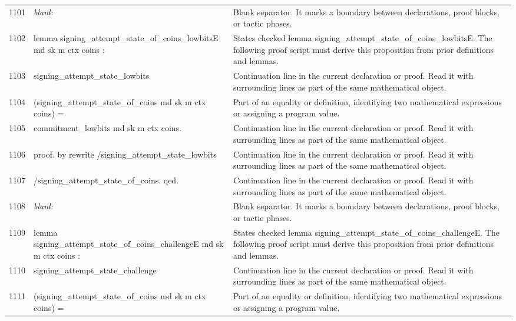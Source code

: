 \documentclass[10pt]{article}
\begin{document}
\begin{longtable}{r L{0.53\textwidth} L{0.37\textwidth}}
1101 & {\ttfamily\scriptsize \emph{blank}} & Blank separator.  It marks a boundary between declarations, proof blocks, or tactic phases. \\
1102 & {\ttfamily\scriptsize lemma signing\_attempt\_state\_of\_coins\_lowbitsE md sk m ctx coins :} & States checked lemma signing\_attempt\_state\_of\_coins\_lowbitsE.  The following proof script must derive this proposition from prior definitions and lemmas. \\
1103 & {\ttfamily\scriptsize   signing\_attempt\_state\_lowbits} & Continuation line in the current declaration or proof.  Read it with surrounding lines as part of the same mathematical object. \\
1104 & {\ttfamily\scriptsize     (signing\_attempt\_state\_of\_coins md sk m ctx coins) =} & Part of an equality or definition, identifying two mathematical expressions or assigning a program value. \\
1105 & {\ttfamily\scriptsize   commitment\_lowbits md sk m ctx coins.} & Continuation line in the current declaration or proof.  Read it with surrounding lines as part of the same mathematical object. \\
1106 & {\ttfamily\scriptsize proof. by rewrite /signing\_attempt\_state\_lowbits} & Continuation line in the current declaration or proof.  Read it with surrounding lines as part of the same mathematical object. \\
1107 & {\ttfamily\scriptsize                   /signing\_attempt\_state\_of\_coins. qed.} & Continuation line in the current declaration or proof.  Read it with surrounding lines as part of the same mathematical object. \\
1108 & {\ttfamily\scriptsize \emph{blank}} & Blank separator.  It marks a boundary between declarations, proof blocks, or tactic phases. \\
1109 & {\ttfamily\scriptsize lemma signing\_attempt\_state\_of\_coins\_challengeE md sk m ctx coins :} & States checked lemma signing\_attempt\_state\_of\_coins\_challengeE.  The following proof script must derive this proposition from prior definitions and lemmas. \\
1110 & {\ttfamily\scriptsize   signing\_attempt\_state\_challenge} & Continuation line in the current declaration or proof.  Read it with surrounding lines as part of the same mathematical object. \\
1111 & {\ttfamily\scriptsize     (signing\_attempt\_state\_of\_coins md sk m ctx coins) =} & Part of an equality or definition, identifying two mathematical expressions or assigning a program value. \\

\end{longtable}
\end{document}
